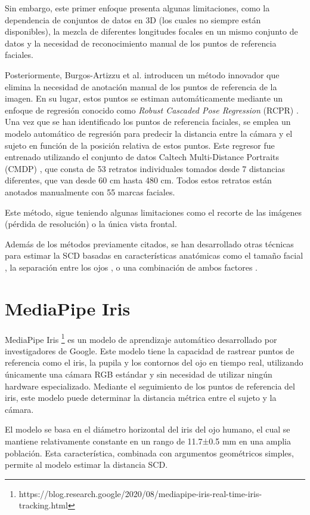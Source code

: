 Sin embargo, este primer enfoque presenta algunas limitaciones, como la dependencia de conjuntos de datos en 3D (los cuales no siempre están disponibles), la mezcla de diferentes longitudes focales en un mismo conjunto de datos y la necesidad de reconocimiento manual de los puntos de referencia faciales.

Posteriormente, Burgos-Artizzu et al. \cite{30} introducen un método innovador que elimina la necesidad de anotación manual de los puntos de referencia de la imagen. En su lugar, estos puntos se estiman automáticamente mediante un enfoque de regresión conocido como \textit{Robust Cascaded Pose Regression} (RCPR) \cite{53}. Una vez que se han identificado los puntos de referencia faciales, se emplea un modelo automático de regresión para predecir la distancia entre la cámara y el sujeto en función de la posición relativa de estos puntos. Este regresor fue entrenado utilizando el conjunto de datos Caltech Multi-Distance Portraits (CMDP) \cite{54}, que consta de 53 retratos individuales tomados desde 7 distancias diferentes, que van desde 60 cm hasta 480 cm. Todos estos retratos están anotados manualmente con 55 marcas faciales.

Este método, sigue teniendo algunas limitaciones como el recorte de las imágenes (pérdida de resolución) o la única vista frontal.

Además de los métodos previamente citados, se han desarrollado otras técnicas para estimar la SCD basadas en características anatómicas como el tamaño facial \cite{32}, la separación entre los ojos \cite{33}, o una combinación de ambos factores \cite{34}.

\section{MediaPipe Iris}

MediaPipe Iris \footnote{https://blog.research.google/2020/08/mediapipe-iris-real-time-iris-tracking.html} es un modelo de aprendizaje automático desarrollado por investigadores de Google. Este modelo tiene la capacidad de rastrear puntos de referencia como el iris, la pupila y los contornos del ojo en tiempo real, utilizando únicamente una cámara RGB estándar y sin necesidad de utilizar ningún hardware especializado. Mediante el seguimiento de los puntos de referencia del iris, este modelo puede determinar la distancia métrica entre el sujeto y la cámara.

El modelo se basa en el diámetro horizontal del iris del ojo humano, el cual se mantiene relativamente constante en un rango de 11.7±0.5 mm en una amplia población. Esta característica, combinada con argumentos geométricos simples, permite al modelo estimar la distancia SCD.


